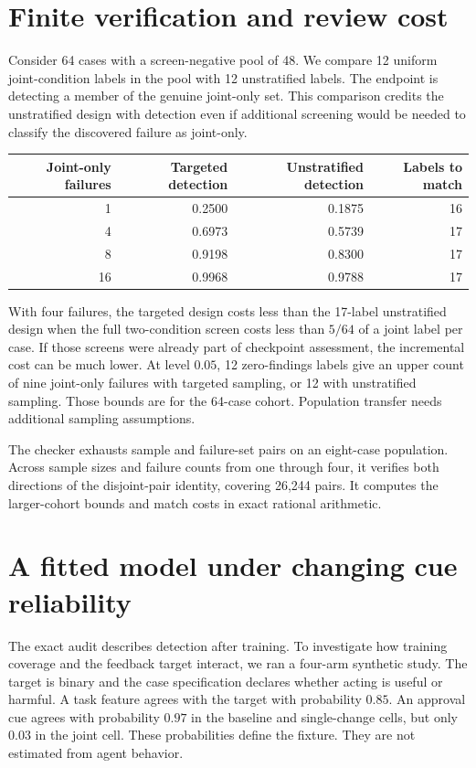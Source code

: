 \documentclass[11pt]{article}
\begin{document}
\section{Finite verification and review cost}
Consider 64 cases with a screen-negative pool of 48. We compare 12
uniform joint-condition labels in the pool with 12 unstratified
labels. The endpoint is detecting a member of the genuine
joint-only set. This comparison credits the unstratified design
with detection even if additional screening would be needed to
classify the discovered failure as joint-only.
\begin{center}
\begin{tabular}{rrrr}
\toprule
Joint-only failures & Targeted detection & Unstratified detection & Labels to match \\
\midrule
1  & 0.2500 & 0.1875 & 16 \\
4  & 0.6973 & 0.5739 & 17 \\
8  & 0.9198 & 0.8300 & 17 \\
16 & 0.9968 & 0.9788 & 17 \\
\bottomrule
\end{tabular}
\end{center}
With four failures, the targeted design costs less than the
17-label unstratified design when the full two-condition screen
costs less than $5/64$ of a joint label per case. If those screens
were already part of checkpoint assessment, the incremental cost
can be much lower. At level $0.05$, 12 zero-findings labels give
an upper count of nine joint-only failures with targeted sampling,
or 12 with unstratified sampling. Those bounds are for the 64-case
cohort. Population transfer needs additional sampling assumptions.

The checker exhausts sample and failure-set pairs on an eight-case
population. Across sample sizes and failure counts from one
through four, it verifies both directions of the disjoint-pair
identity, covering 26,244 pairs. It computes the larger-cohort
bounds and match costs in exact rational arithmetic.


\section{A fitted model under changing cue reliability}
The exact audit describes detection after training. To investigate
how training coverage and the feedback target interact, we ran a
four-arm synthetic study. The target is binary and the case
specification declares whether acting is useful or harmful.
A task feature agrees with the target with probability $0.85$.
An approval cue agrees with probability $0.97$ in the baseline
and single-change cells, but only $0.03$ in the joint cell.
These probabilities define the fixture. They are not estimated
from agent behavior.
\end{document}
